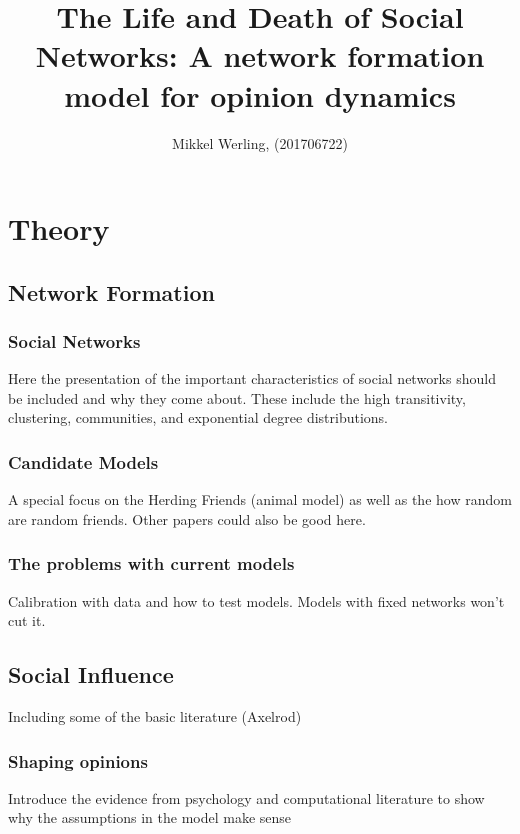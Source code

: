\documentclass{article}
\title{The Life and Death of Social Networks: A network formation model for opinion dynamics}
\author{Mikkel Werling, (201706722)}
\date{}
\begin{document}
\maketitle


\section{Theory}

\subsection{Network Formation}

\subsubsection{Social Networks}
Here the presentation of the important characteristics of social networks should be included and why they come about. 
These include the high transitivity, clustering, communities, and exponential degree distributions.

\subsubsection{Candidate Models}

A special focus on the Herding Friends (animal model) as well as the how random are random friends. Other papers could also be good here.

\subsubsection{The problems with current models}

Calibration with data and how to test models. Models with fixed networks won't cut it. 

\subsection{Social Influence}

Including some of the basic literature (Axelrod)

\subsubsection{Shaping opinions}

Introduce the evidence from psychology and computational literature to show why the assumptions in the model make sense
\end{document}
